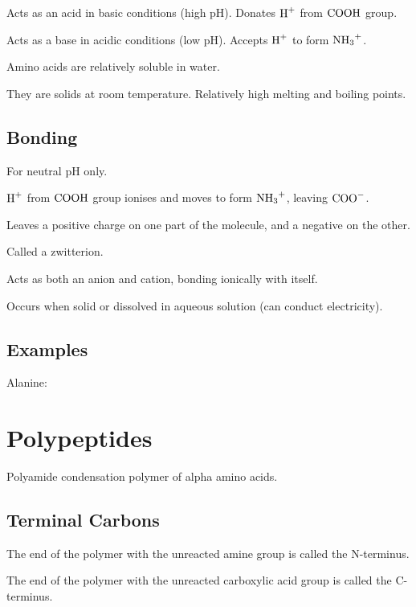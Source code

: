 \documentclass[a4paper,11pt]{article}
\begin{document}
Acts as an acid in basic conditions (high pH). Donates $\ce{H+}$ from
$\ce{COOH}$ group.

Acts as a base in acidic conditions (low pH). Accepts $\ce{H+}$ to form
$\ce{NH3+}$.

Amino acids are relatively soluble in water.

They are solids at room temperature. Relatively high melting and boiling points.


\subsection{Bonding}

For neutral pH only.

$\ce{H+}$ from $\ce{COOH}$ group ionises and moves to form $\ce{NH3+}$, leaving
$\ce{COO-}$.

Leaves a positive charge on one part of the molecule, and a negative on the
other.

Called a zwitterion.

Acts as both an anion and cation, bonding ionically with itself.

Occurs when solid or dissolved in aqueous solution (can conduct electricity).


\subsection{Examples}

Alanine:

\begin{center}
\end{center}




\section{Polypeptides}

Polyamide condensation polymer of alpha amino acids.


\subsection{Terminal Carbons}

The end of the polymer with the unreacted amine group is called the N-terminus.

The end of the polymer with the unreacted carboxylic acid group is called the
C-terminus.
\end{document}
